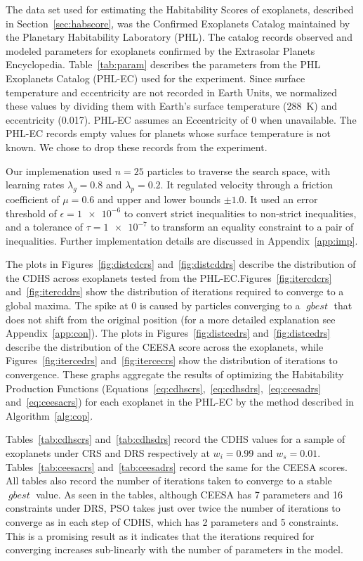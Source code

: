 \documentclass[10pt]{article}
\DeclareMathOperator*{\gbest}{\mathit{gbest}}
\begin{document}
The data set used for estimating the Habitability Scores of exoplanets, described in Section~\ref{sec:habscore}, was the
Confirmed Exoplanets Catalog maintained by the Planetary Habitability Laboratory (PHL). The catalog records observed and
modeled parameters for exoplanets confirmed by the Extrasolar Planets Encyclopedia. Table~\ref{tab:param} describes the
parameters from the PHL Exoplanets Catalog (PHL-EC) used for the experiment. Since surface temperature and eccentricity
are not recorded in Earth Units, we normalized these values by dividing them with Earth's surface temperature
(\SI{288}{\kelvin}) and eccentricity (\num{0.017}). PHL-EC assumes an Eccentricity of 0 when unavailable. The PHL-EC
records empty values for planets whose surface temperature is not known. We chose to drop these records from the
experiment.

Our implemenation used $n=25$ particles to traverse the search space, with learning rates $\lambda_g=0.8$ and
$\lambda_p=0.2$. It regulated velocity through a friction coefficient of $\mu=0.6$ and upper and lower bounds $\pm1.0$.
It used an error threshold of $\epsilon=\num{1e-6}$ to convert strict inequalities to non-strict inequalities, and a
tolerance of $\tau=\num{1e-7}$ to transform an equality constraint to a pair of inequalities. Further implementation
details are discussed in Appendix~\ref{app:imp}.

The plots in Figures~\ref{fig:distcdcrs} and~\ref{fig:distcddrs} describe the distribution of the CDHS across exoplanets
tested from the PHL-EC.\@ Figures~\ref{fig:itercdcrs} and~\ref{fig:itercddrs} show the distribution of iterations
required to converge to a global maxima. The spike at 0 is caused by particles converging to a $\gbest$ that does not
shift from the original position (for a more detailed explanation see Appendix~\ref{app:con}). The plots in
Figures~\ref{fig:distcedrs} and~\ref{fig:distcedrs} describe the distribution of the CEESA score across the exoplanets,
while Figures~\ref{fig:itercedrs} and~\ref{fig:itercecrs} show the distribution of iterations to convergence. These
graphs aggregate the results of optimizing the Habitability Production Functions
(Equations~\ref{eq:cdhscrs},~\ref{eq:cdhsdrs},~\ref{eq:ceesadrs} and~\ref{eq:ceesacrs}) for each exoplanet in the PHL-EC
by the method described in Algorithm~\ref{alg:cop}.

Tables~\ref{tab:cdhscrs} and~\ref{tab:cdhsdrs} record the CDHS values for a sample of exoplanets under CRS and DRS
respectively at $w_i=0.99$ and $w_s=0.01$. Tables~\ref{tab:ceesacrs} and~\ref{tab:ceesadrs} record the same for the
CEESA scores. All tables also record the number of iterations taken to converge to a stable $\gbest$ value. As seen in
the tables, although CEESA has 7 parameters and 16 constraints under DRS, PSO takes just over twice the number of
iterations to converge as in each step of CDHS, which has 2 parameters and 5 constraints. This is a promising result as
it indicates that the iterations required for converging increases sub-linearly with the number of parameters in the
model.
\end{document}
